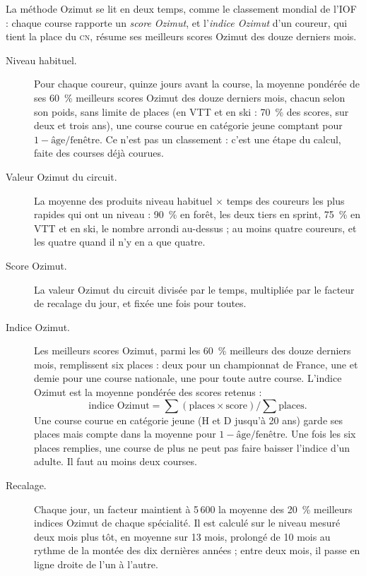 \documentclass[11pt,a4paper]{article}
\newcommand{\CN}{\textsc{cn}}
\begin{document}
La méthode Ozimut se lit en deux temps, comme le classement mondial de l'IOF : chaque course rapporte un \emph{score Ozimut}, et l'\emph{indice Ozimut} d'un coureur, qui tient la place du \CN, résume ses meilleurs scores Ozimut des douze derniers mois.

\begin{description}
  \item[Niveau habituel.] Pour chaque coureur, quinze jours avant la course, la moyenne pondérée de ses 60~\% meilleurs scores Ozimut des douze derniers mois, chacun selon son poids, sans limite de places (en VTT et en ski : 70~\% des scores, sur deux et trois ans), une course courue en catégorie jeune comptant pour $1 - \text{âge} / \text{fenêtre}$. Ce n'est pas un classement : c'est une étape du calcul, faite des courses déjà courues.
  \item[Valeur Ozimut du circuit.] La moyenne des produits niveau habituel $\times$ temps des coureurs les plus rapides qui ont un niveau : 90~\% en forêt, les deux tiers en sprint, 75~\% en VTT et en ski, le nombre arrondi au-dessus ; au moins quatre coureurs, et les quatre quand il n'y en a que quatre.
  \item[Score Ozimut.] La valeur Ozimut du circuit divisée par le temps, multipliée par le facteur de recalage du jour, et fixée une fois pour toutes.
  \item[Indice Ozimut.] Les meilleurs scores Ozimut, parmi les 60~\% meilleurs des douze derniers mois, remplissent six places : deux pour un championnat de France, une et demie pour une course nationale, une pour toute autre course. L'indice Ozimut est la moyenne pondérée des scores retenus :
  \[ \text{indice Ozimut} = \textstyle\sum (\text{places} \times \text{score}) \big/ \sum \text{places} . \]
  Une course courue en catégorie jeune (H et D jusqu'à 20 ans) garde ses places mais compte dans la moyenne pour $1 - \text{âge} / \text{fenêtre}$. Une fois les six places remplies, une course de plus ne peut pas faire baisser l'indice d'un adulte. Il faut au moins deux courses.
  \item[Recalage.] Chaque jour, un facteur maintient à 5\,600 la moyenne des 20~\% meilleurs indices Ozimut de chaque spécialité. Il est calculé sur le niveau mesuré deux mois plus tôt, en moyenne sur 13 mois, prolongé de 10 mois au rythme de la montée des dix dernières années ; entre deux mois, il passe en ligne droite de l'un à l'autre.
\end{description}
\end{document}
